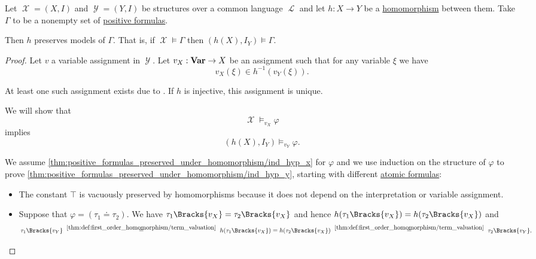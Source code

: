 \begin{proposition}\label{thm:positive_formulas_preserved_under_homomorphism}
  Let \( \mscrX = (X, I) \) and \( \mscrY = (Y, I) \) be structures over a common language \( \mscrL \) and let \( h: X \to Y \) be a \hyperref[def:first_order_homomorphism]{homomorphism} between them. Take \( \Gamma \) to be a nonempty set of \hyperref[def:positive_formula]{positive formulas}.

  Then \( h \) preserves models of \( \Gamma \). That is, if \( \mscrX \vDash \Gamma \) then \( (h(X), I_Y) \vDash \Gamma \).
\end{proposition}
\begin{proof}
  Let \( v \) a variable assignment in \( \mscrY \). Let \( v_X: \operatorname{\mathbf{Var}} \to X \) be an assignment such that for any variable \( \xi \) we have
  \begin{equation*}
    v_X(\xi) \in h^{-1}(v_Y(\xi)).
  \end{equation*}

  At least one such assignment exists due to . If \( h \) is injective, this assignment is unique.

  We will show that
  \begin{equation}\label{thm:positive_formulas_preserved_under_homomorphism/ind_hyp_x}
    \mscrX \vDash_{v_X} \varphi
  \end{equation}
  implies
  \begin{equation}\label{thm:positive_formulas_preserved_under_homomorphism/ind_hyp_y}
    (h(X), I_Y) \vDash_{v_Y} \varphi.
  \end{equation}

  We assume \eqref{thm:positive_formulas_preserved_under_homomorphism/ind_hyp_x} for \( \varphi \) and we use induction on the structure of \( \varphi \) to prove \eqref{thm:positive_formulas_preserved_under_homomorphism/ind_hyp_y}, starting with different \hyperref[def:first_order_syntax/atomic_formula]{atomic formulas}:
  \begin{itemize}
    \item The constant \( \top \) is vacuously preserved by homomorphisms because it does not depend on the interpretation or variable assignment.

    \item Suppose that \( \varphi = (\tau_1 \doteq \tau_2) \). We have \( \tau_1\Bracks{v_X} = \tau_2\Bracks{v_X} \) and hence \( h(\tau_1\Bracks{v_X}) = h(\tau_2\Bracks{v_X}) \) and
    \begin{equation*}
      \tau_1\Bracks{v_Y}
      \reloset {\ref{thm:def:first_order_homomorphism/term_valuation}} =
      h(\tau_1\Bracks{v_X})
      =
      h(\tau_2\Bracks{v_X})
      \reloset {\ref{thm:def:first_order_homomorphism/term_valuation}} =
      \tau_2\Bracks{v_Y}.
    \end{equation*}


\end{itemize}
\end{proof}
